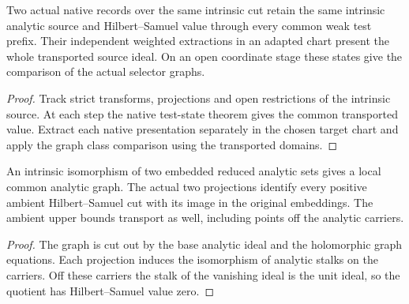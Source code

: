 \begin{theorem}
\label{hir:g1-native-weighted-prefix-state}
\leanok
Two actual native records over the same intrinsic cut retain
the same intrinsic analytic source and Hilbert--Samuel value
through every common weak test prefix. Their independent
weighted extractions in an adapted chart present the whole
transported source ideal. On an open coordinate stage these
states give the comparison of the actual selector graphs.
\end{theorem}
\begin{proof}
Track strict transforms, projections and open restrictions of
the intrinsic source. At each step the native test-state
theorem gives the common transported value. Extract each native
presentation separately in the chosen target chart and apply
the graph class comparison using the transported domains.
\end{proof}

\begin{theorem}
\label{hir:g1-common-graph-hs-cuts}
\leanok
An intrinsic isomorphism of two embedded reduced analytic
sets gives a local common analytic graph. The actual two
projections identify every positive ambient Hilbert--Samuel
cut with its image in the original embeddings. The ambient
upper bounds transport as well, including points off the
analytic carriers.
\end{theorem}
\begin{proof}
The graph is cut out by the base analytic ideal and the
holomorphic graph equations. Each projection induces the
isomorphism of analytic stalks on the carriers. Off these
carriers the stalk of the vanishing ideal is the unit ideal,
so the quotient has Hilbert--Samuel value zero.
\end{proof}

